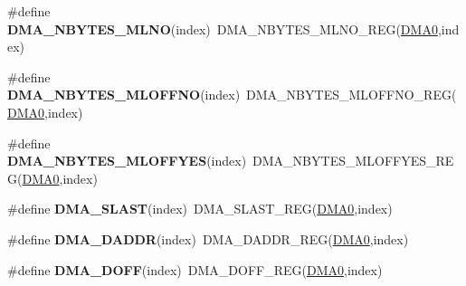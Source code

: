 \begin{DoxyCompactItemize}
\item 
\#define {\bfseries D\+M\+A\+\_\+\+N\+B\+Y\+T\+E\+S\+\_\+\+M\+L\+NO}(index)~D\+M\+A\+\_\+\+N\+B\+Y\+T\+E\+S\+\_\+\+M\+L\+N\+O\+\_\+\+R\+EG(\hyperlink{group__DMA__Peripheral__Access__Layer_ga4103044f9ca209772f513dc694513ffb}{D\+M\+A0},index)\hypertarget{group__DMA__Register__Accessor__Macros_gad7691b3856b237a914bf0f8c7cd28804}{}\label{group__DMA__Register__Accessor__Macros_gad7691b3856b237a914bf0f8c7cd28804}

\item 
\#define {\bfseries D\+M\+A\+\_\+\+N\+B\+Y\+T\+E\+S\+\_\+\+M\+L\+O\+F\+F\+NO}(index)~D\+M\+A\+\_\+\+N\+B\+Y\+T\+E\+S\+\_\+\+M\+L\+O\+F\+F\+N\+O\+\_\+\+R\+EG(\hyperlink{group__DMA__Peripheral__Access__Layer_ga4103044f9ca209772f513dc694513ffb}{D\+M\+A0},index)\hypertarget{group__DMA__Register__Accessor__Macros_ga47a6deae65a6ba78099a77b1d700b0a4}{}\label{group__DMA__Register__Accessor__Macros_ga47a6deae65a6ba78099a77b1d700b0a4}

\item 
\#define {\bfseries D\+M\+A\+\_\+\+N\+B\+Y\+T\+E\+S\+\_\+\+M\+L\+O\+F\+F\+Y\+ES}(index)~D\+M\+A\+\_\+\+N\+B\+Y\+T\+E\+S\+\_\+\+M\+L\+O\+F\+F\+Y\+E\+S\+\_\+\+R\+EG(\hyperlink{group__DMA__Peripheral__Access__Layer_ga4103044f9ca209772f513dc694513ffb}{D\+M\+A0},index)\hypertarget{group__DMA__Register__Accessor__Macros_ga2b5c965156acab64292450aab3e4e813}{}\label{group__DMA__Register__Accessor__Macros_ga2b5c965156acab64292450aab3e4e813}

\item 
\#define {\bfseries D\+M\+A\+\_\+\+S\+L\+A\+ST}(index)~D\+M\+A\+\_\+\+S\+L\+A\+S\+T\+\_\+\+R\+EG(\hyperlink{group__DMA__Peripheral__Access__Layer_ga4103044f9ca209772f513dc694513ffb}{D\+M\+A0},index)\hypertarget{group__DMA__Register__Accessor__Macros_gafe14777337c386e625ae3a66162832c9}{}\label{group__DMA__Register__Accessor__Macros_gafe14777337c386e625ae3a66162832c9}

\item 
\#define {\bfseries D\+M\+A\+\_\+\+D\+A\+D\+DR}(index)~D\+M\+A\+\_\+\+D\+A\+D\+D\+R\+\_\+\+R\+EG(\hyperlink{group__DMA__Peripheral__Access__Layer_ga4103044f9ca209772f513dc694513ffb}{D\+M\+A0},index)\hypertarget{group__DMA__Register__Accessor__Macros_gac891509293585f659dec043eb18e381f}{}\label{group__DMA__Register__Accessor__Macros_gac891509293585f659dec043eb18e381f}

\item 
\#define {\bfseries D\+M\+A\+\_\+\+D\+O\+FF}(index)~D\+M\+A\+\_\+\+D\+O\+F\+F\+\_\+\+R\+EG(\hyperlink{group__DMA__Peripheral__Access__Layer_ga4103044f9ca209772f513dc694513ffb}{D\+M\+A0},index)\hypertarget{group__DMA__Register__Accessor__Macros_gab285e557469e7f2e4501337a5817fe19}{}\label{group__DMA__Register__Accessor__Macros_gab285e557469e7f2e4501337a5817fe19}


\end{DoxyCompactItemize}
